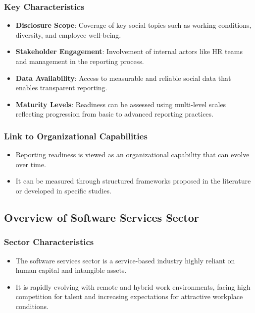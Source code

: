 \subsubsection{Key Characteristics}
\begin{itemize}
    \item \textbf{Disclosure Scope}: Coverage of key social topics such as working conditions, diversity, and employee well-being.
    \item \textbf{Stakeholder Engagement}: Involvement of internal actors like HR teams and management in the reporting process.
    \item \textbf{Data Availability}: Access to measurable and reliable social data that enables transparent reporting.
    \item \textbf{Maturity Levels}: Readiness can be assessed using multi-level scales reflecting progression from basic to advanced reporting practices.
\end{itemize}

\subsubsection{Link to Organizational Capabilities}
\begin{itemize}
    \item Reporting readiness is viewed as an organizational capability that can evolve over time.
    \item It can be measured through structured frameworks proposed in the literature or developed in specific studies.
\end{itemize}

\subsection{Overview of Software Services Sector}
\subsubsection{Sector Characteristics}
\begin{itemize}
    \item The software services sector is a service-based industry highly reliant on human capital and intangible assets. 
    \item It is rapidly evolving with remote and hybrid work environments, facing high competition for talent and increasing expectations for attractive workplace conditions.
\end{itemize}

